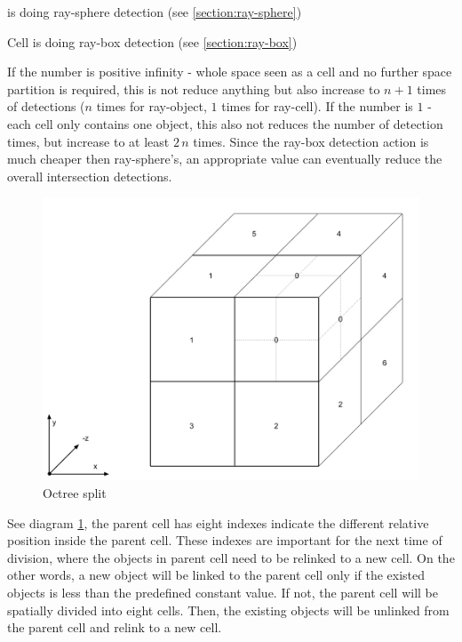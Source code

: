\begin{description}
	\setlength{\parskip}{0pt}
	\item[$\bullet$ Object Complexity]  is doing ray-sphere detection (see \ref{section:ray-sphere})
	\item[$\bullet$ Cell Complexity] Cell is doing ray-box detection (see \ref{section:ray-box})
\end{description}

If the number is positive infinity - whole space seen as a cell and no further space partition is required, this is not reduce anything but also increase to $n + 1$ times of detections ($n$ times for ray-object, $1$ times for ray-cell). If the number is $1$ - each cell only contains one object, this also not reduces the number of detection times, but increase to at least $2\,n$ times. Since the ray-box detection action is much cheaper then ray-sphere's, an appropriate value can eventually reduce the overall intersection detections.

\begin{figure}[H]
\caption{Octree split}
\label{fig:octree-split}
\centering
\includegraphics[width=\linewidth]{Figures/octree-split.png}
\decoRule
\end{figure}

See diagram \ref{fig:octree-split}, the parent cell has eight indexes indicate the different relative position inside the parent cell. These indexes are important for the next time of division, where the objects in parent cell need to be relinked to a new cell. On the other words, a new object will be linked to the parent cell only if the existed objects is less than the predefined constant value. If not, the parent cell will be spatially divided into eight cells. Then, the existing objects will be unlinked from the parent cell and relink to a new cell.


